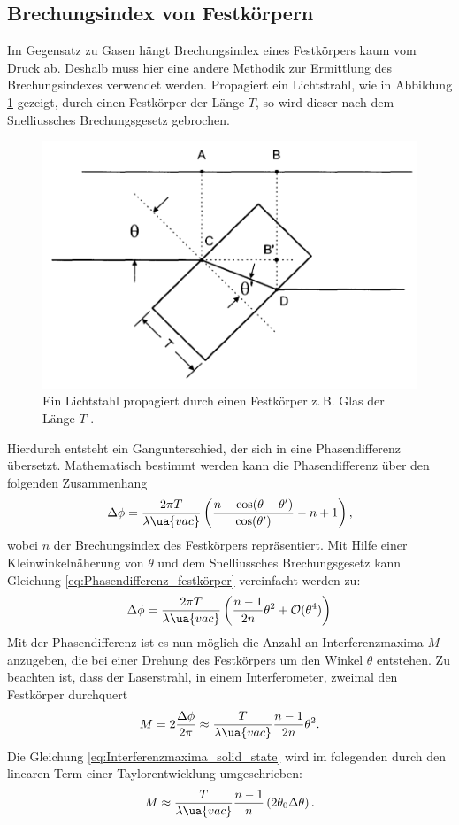\subsection{Brechungsindex von Festkörpern}
Im Gegensatz zu Gasen hängt Brechungsindex eines Festkörpers kaum vom Druck ab.
Deshalb muss hier eine andere Methodik zur Ermittlung des Brechungsindexes verwendet werden.
Propagiert ein Lichtstrahl, wie in Abbildung \ref{fig:slag} gezeigt, durch einen Festkörper der Länge $T$,
so wird dieser nach dem Snelliussches Brechungsgesetz gebrochen.
\begin{figure}
\centering
\includegraphics[width=0.6\linewidth]{./content/images/slab.png}
\caption{Ein Lichtstahl propagiert durch einen Festkörper z.\,B. Glas der Länge $T$ \cite{anleitung64}.}
\label{fig:slag}
\end{figure}
Hierdurch entsteht ein Gangunterschied, der sich in eine Phasendifferenz übersetzt.
Mathematisch bestimmt werden kann die Phasendifferenz über den folgenden Zusammenhang
\begin{equation}
  \label{eq:Phasendifferenz_festkörper}
  \Delta\phi=\frac{ 2\pi T }{ \lambda\ua{vac} }\left( \frac{ n-\cos(\theta-\theta') }{ \cos(\theta') } - n+1\right),
\end{equation}
wobei $n$ der Brechungsindex des Festkörpers repräsentiert.
Mit Hilfe einer Kleinwinkelnäherung von $\theta$ und dem Snelliussches Brechungsgesetz kann
Gleichung \eqref{eq:Phasendifferenz_festkörper} vereinfacht werden zu:
\begin{equation}
  \Delta\phi=\frac{ 2\pi T }{ \lambda\ua{vac} }\left( \frac{ n-1 }{ 2n }\theta^2 + \mathcal{O}(\theta^4)\right)
\end{equation}
Mit der Phasendifferenz ist es nun möglich die Anzahl an Interferenzmaxima $M$ anzugeben, die bei einer Drehung
des Festkörpers um den Winkel $\theta$ entstehen. Zu beachten ist, dass der Laserstrahl, in einem Interferometer, zweimal den Festkörper durchquert
\begin{equation}
  \label{eq:Interferenzmaxima_solid_state}
  M=2\frac{\Delta\phi}{2\pi}\approx \frac{T}{\lambda\ua{vac}}\frac{n-1}{2n}\theta^2.
\end{equation}
Die Gleichung \eqref{eq:Interferenzmaxima_solid_state} wird im folegenden
durch den linearen Term einer Taylorentwicklung umgeschrieben:
\begin{equation}
\label{eq:entwicklung_interferenzmaxima}
  M\approx\frac{T}{\lambda\ua{vac}}\frac{n-1}{n}\left( 2\theta_0 \Delta \theta \right).
\end{equation}

